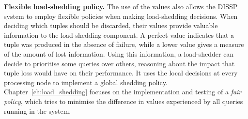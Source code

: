 \textbf{Flexible \mbox{load-shedding} policy.}
The use of the \sic values also allows the DISSP system to employ flexible policies when making
load-shedding decisions. When deciding which tuples should be discarded, their \sic values provide
valuable information to the load-shedding component. A perfect value indicates that a tuple was produced
in the absence of failure, while a lower value gives a measure of the amount of lost information.
Using this information, a load-shedder can decide to prioritise some queries over others,
reasoning about the impact that tuple loss would have on their performance. It uses the local
decisions at every processing node to implement a global shedding policy.
Chapter~\ref{ch:load_shedding} focuses on the implementation and testing of a \emph{fair
policy}, which tries to minimise the difference in \sic values experienced by all queries running in
the system.



\begin{comment}
\paragraph{Extensibility} The second main design choice has been \emph{extensibility}. Together with a
set of traditional operators taken from the relational database world, such as Average, Filter, Top-K and so forth, a complete system
should easily allow the implementation of \emph{custom operators}. Even though a great deal of processing
can be carried out with a limited set of operators, many times it is necessary to introduce some new
operators, designed according to the user needs. For instance when dealing with the processing of social
media data, a query could deal with the sentiment analysis of the content, thus requiring the use of
Natural Language Processing operators. The same is true for financial operators implementing proprietary
trading algorithms. For these reasons it was decided to provide the implementation of some generic
operators while allowing the easy implementation of new ones.
\end{comment}

